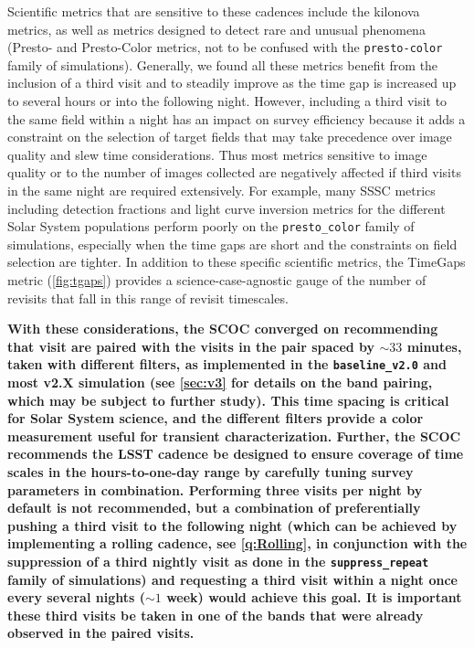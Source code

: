 Scientific metrics that are sensitive to these cadences include the kilonova metrics, as well as metrics designed to detect rare and unusual phenomena (Presto- and Presto-Color metrics, not to be confused with the \texttt{presto-color} family of simulations). Generally, we found all these metrics benefit from the inclusion of a third visit and to steadily improve as the time gap is increased up to several hours or into the following night. However, including a third visit to the same field within a night has an impact on survey efficiency because it adds a constraint on the selection of target fields that may take precedence over image quality and slew time considerations. Thus most metrics sensitive to image quality or to the number of images collected are negatively affected if third visits in the same night are required extensively. For example, many SSSC metrics including detection fractions and light curve inversion metrics for the different Solar System populations
 perform poorly on the \texttt{presto\_color} family of simulations, especially when the time gaps are short and the constraints on field selection are tighter. In addition to these specific scientific metrics, the TimeGaps metric (\autoref{fig:tgaps}) provides a science-case-agnostic gauge of the number of revisits that fall in this range of revisit timescales.


{\bf With these considerations, the SCOC converged on recommending that visit are paired with the visits in the pair spaced by $\sim33$ minutes, taken with different filters, as implemented in the \texttt{baseline\_v2.0} and most v2.X simulation (see \autoref{sec:v3} for details on the band pairing, which may be subject to further study).
This time spacing is critical for Solar System science, and the different filters provide a color measurement useful for transient characterization. Further, the SCOC recommends the LSST cadence be designed to ensure coverage of time scales in the hours-to-one-day range by carefully tuning survey parameters in combination. Performing three visits per night by default is not recommended, but a combination of preferentially pushing a third visit to the following night (which can be achieved by implementing a rolling cadence, see \autoref{q:Rolling}, in conjunction with the suppression of a third nightly visit as done in the \texttt{suppress\_repeat} family of simulations) and requesting a third visit within a night once every several nights ($\sim1$ week) would achieve this goal.
It is important these third visits be taken in one of the bands that were already observed in the paired visits.}

